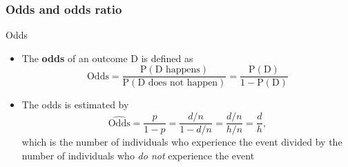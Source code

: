 \documentclass[compress, notes=hide]{beamer}
\newcommand{\hl}[1]{\textbf{#1}}
\begin{document}


\begin{frame}
			  \frametitle{Odds and odds ratio} 
\begin{block}{Odds}
\begin{itemize}
\item The \hl{odds} of an outcome D is defined as
\begin{equation}
\mathrm{Odds} = \frac{\mathrm{P}(\text{D happens})}{\mathrm{P}(\text{D does not happen})} = \frac{\mathrm{P}(\mathrm{D})}{1 - \mathrm{P}(\mathrm{D})}\nonumber
\end{equation}
\item The odds is estimated by
\begin{equation}
\widehat{\mathrm{Odds}} = \frac{p}{1-p} = \frac{d/n}{1-d/n} = \frac{d/n}{h/n} = \frac{d}{h},\nonumber
\end{equation}
which is the number of individuals who experience the event divided by
the number of individuals who \emph{do not} experience the event
\end{itemize}
\end{block}
\end{frame}
\end{document}
